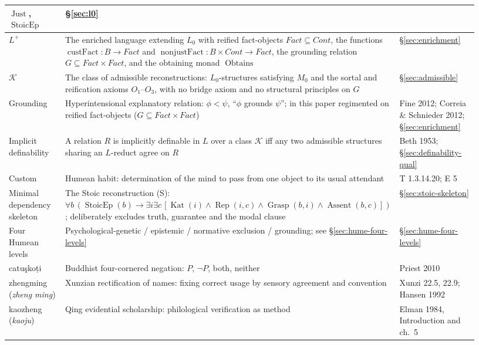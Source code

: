 \documentclass[11pt]{article}
\theoremstyle{plain}
\theoremstyle{definition}
\theoremstyle{remark}
\begin{document}
\begin{center}
\begin{longtable}{p{0.20\linewidth} p{0.45\linewidth} p{0.28\linewidth}}
$\operatorname{Just}$, $\operatorname{StoicEp}$ &
\S\ref{sec:l0} \\
\hline
$L^+$ &
The enriched language extending $L_0$ with reified fact-objects
$\mathit{Fact}\subseteq\mathit{Cont}$, the functions
$\operatorname{custFact}:B\to\mathit{Fact}$ and
$\operatorname{nonjustFact}:B\times\mathit{Cont}\to\mathit{Fact}$,
the grounding relation $G\subseteq\mathit{Fact}\times\mathit{Fact}$,
and the obtaining monad $\operatorname{Obtains}$ &
\S\ref{sec:enrichment} \\
\hline
$\mathcal K$ &
The class of admissible reconstructions: $L_0$-structures satisfying
$M_0$ and the sortal and reification axioms $O_1$--$O_3$, with no
bridge axiom and no structural principles on $G$& \S\ref{sec:admissible} \\
\hline
Grounding &
Hyperintensional explanatory relation: $\phi < \psi$, ``$\phi$ grounds
$\psi$''; in this paper regimented on reified fact-objects
($G \subseteq \mathit{Fact}\times\mathit{Fact}$)& Fine 2012; Correia \& Schnieder 2012; \S\ref{sec:enrichment} \\
\hline
Implicit definability &
A relation $R$ is implicitly definable in $L$ over a class $\mathcal K$
iff any two admissible structures sharing an $L$-reduct agree on $R$& Beth 1953; \S\ref{sec:definability-qual} \\
\hline
Custom &
Humean habit: determination of the mind to pass from one object to its
usual attendant &
T 1.3.14.20; E 5 \\
\hline
Minimal dependency skeleton &
The Stoic reconstruction (S): $\forall b\,(\operatorname{StoicEp}(b)
\to \exists i\exists c\,[\operatorname{Kat}(i)\land
\operatorname{Rep}(i,c)\land \operatorname{Grasp}(b,i)\land
\operatorname{Assent}(b,c)])$; deliberately excludes truth, guarantee
and the modal clause &
\S\ref{sec:stoic-skeleton} \\
\hline
Four Humean levels &
Psychological-genetic / epistemic / normative exclusion / grounding;
see \S\ref{sec:hume-four-levels} &
\S\ref{sec:hume-four-levels} \\
\hline
catu\c{s}ko\d{t}i &
Buddhist four-cornered negation: $P$, $\neg P$, both, neither &
Priest 2010 \\
\hline
zhengming (\emph{zheng ming}) &
Xunzian rectification of names: fixing correct usage by sensory
agreement and convention &
Xunzi 22.5, 22.9; Hansen 1992 \\
\hline
kaozheng (\emph{kao\-ju}) &
Qing evidential scholarship: philological verification as method &
Elman 1984, Introduction and ch.~5 \\
\hline
\end{longtable}
\end{center}
\end{document}
